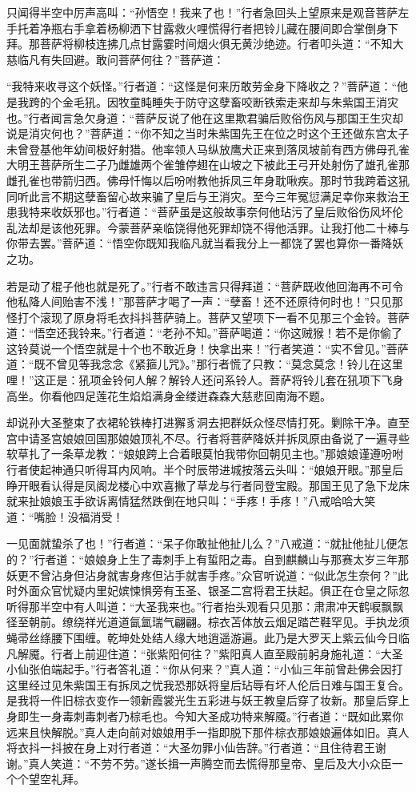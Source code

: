 \documentclass[12pt,UTF8]{ctexbook}
\begin{document}
只闻得半空中厉声高叫：“孙悟空！我来了也！”行者急回头上望原来是观音菩萨左手托着净瓶右手拿着杨柳洒下甘露救火哩慌得行者把铃儿藏在腰间即合掌倒身下拜。那菩萨将柳枝连拂几点甘露霎时间烟火俱无黄沙绝迹。行者叩头道：“不知大慈临凡有失回避。敢问菩萨何往？”菩萨道：

“我特来收寻这个妖怪。”行者道：“这怪是何来历敢劳金身下降收之？”菩萨道：“他是我跨的个金毛犼。因牧童盹睡失于防守这孽畜咬断铁索走来却与朱紫国王消灾也。”行者闻言急欠身道：“菩萨反说了他在这里欺君骗后败俗伤风与那国王生灾却说是消灾何也？”菩萨道：“你不知之当时朱紫国先王在位之时这个王还做东宫太子未曾登基他年幼间极好射猎。他率领人马纵放鹰犬正来到落凤坡前有西方佛母孔雀大明王菩萨所生二子乃雌雄两个雀雏停翅在山坡之下被此王弓开处射伤了雄孔雀那雌孔雀也带箭归西。佛母忏悔以后吩咐教他拆凤三年身耽啾疾。那时节我跨着这犼同听此言不期这孽畜留心故来骗了皇后与王消灾。至今三年冤愆满足幸你来救治王患我特来收妖邪也。”行者道：“菩萨虽是这般故事奈何他玷污了皇后败俗伤风坏伦乱法却是该他死罪。今蒙菩萨亲临饶得他死罪却饶不得他活罪。让我打他二十棒与你带去罢。”菩萨道：“悟空你既知我临凡就当看我分上一都饶了罢也算你一番降妖之功。

若是动了棍子他也就是死了。”行者不敢违言只得拜道：“菩萨既收他回海再不可令他私降人间贻害不浅！”那菩萨才喝了一声：“孽畜！还不还原待何时也！”只见那怪打个滚现了原身将毛衣抖抖菩萨骑上。菩萨又望项下一看不见那三个金铃。菩萨道：“悟空还我铃来。”行者道：“老孙不知。”菩萨喝道：“你这贼猴！若不是你偷了这铃莫说一个悟空就是十个也不敢近身！快拿出来！”行者笑道：“实不曾见。”菩萨道：“既不曾见等我念念《紧箍儿咒》。”那行者慌了只教：“莫念莫念！铃儿在这里哩！”这正是：犼项金铃何人解？解铃人还问系铃人。菩萨将铃儿套在犼项下飞身高坐。你看他四足莲花生焰焰满身金缕迸森森大慈悲回南海不题。

却说孙大圣整束了衣裙轮铁棒打进獬豸洞去把群妖众怪尽情打死。剿除干净。直至宫中请圣宫娘娘回国那娘娘顶礼不尽。行者将菩萨降妖并拆凤原由备说了一遍寻些软草扎了一条草龙教：“娘娘跨上合着眼莫怕我带你回朝见主也。”那娘娘谨遵吩咐行者使起神通只听得耳内风响。半个时辰带进城按落云头叫：“娘娘开眼。”那皇后睁开眼看认得是凤阁龙楼心中欢喜撇了草龙与行者同登宝殿。那国王见了急下龙床就来扯娘娘玉手欲诉离情猛然跌倒在地只叫：“手疼！手疼！”八戒哈哈大笑道：“嘴脸！没福消受！

一见面就蛰杀了也！”行者道：“呆子你敢扯他扯儿么？”八戒道：“就扯他扯儿便怎的？”行者道：“娘娘身上生了毒刺手上有蜇阳之毒。自到麒麟山与那赛太岁三年那妖更不曾沾身但沾身就害身疼但沾手就害手疼。”众官听说道：“似此怎生奈何？”此时外面众官忧疑内里妃嫔悚惧旁有玉圣、银圣二宫将君王扶起。俱正在仓皇之际忽听得那半空中有人叫道：“大圣我来也。”行者抬头观看只见那：肃肃冲天鹤唳飘飘径至朝前。缭绕祥光道道氤氲瑞气翩翩。棕衣苫体放云烟足踏芒鞋罕见。手执龙须蝇帚丝绦腰下围缠。乾坤处处结人缘大地逍遥游遍。此乃是大罗天上紫云仙今日临凡解魇。行者上前迎住道：“张紫阳何往？”紫阳真人直至殿前躬身施礼道：“大圣小仙张伯端起手。”行者答礼道：“你从何来？”真人道：“小仙三年前曾赴佛会因打这里经过见朱紫国王有拆凤之忧我恐那妖将皇后玷辱有坏人伦后日难与国王复合。是我将一件旧棕衣变作一领新霞裳光生五彩进与妖王教皇后穿了妆新。那皇后穿上身即生一身毒刺毒刺者乃棕毛也。今知大圣成功特来解魇。”行者道：“既如此累你远来且快解脱。”真人走向前对娘娘用手一指即脱下那件棕衣那娘娘遍体如旧。真人将衣抖一抖披在身上对行者道：“大圣勿罪小仙告辞。”行者道：“且住待君王谢谢。”真人笑道：“不劳不劳。”遂长揖一声腾空而去慌得那皇帝、皇后及大小众臣一个个望空礼拜。
\end{document}
